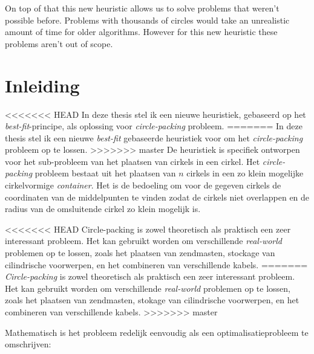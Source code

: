 \documentclass[12pt,a4paper,oneside]{book}
\begin{document}
On top of that this new heuristic allows us to solve problems that weren't possible before.
Problems with thousands of circles would take an unrealistic amount of time for older algorithms.
However for this new heuristic these problems aren't out of scope.

\newpage

\tableofcontents
\listoffigures
{}
\listoftables
{}

\newpage

\setcounter{page}{0}

\chapter{Inleiding}

<<<<<<< HEAD
In deze thesis stel ik een nieuwe heuristiek, gebaseerd op het \textit{best-fit}-principe, als oplossing voor \textit{circle-packing} probleem.
=======
In deze thesis stel ik een nieuwe \textit{best-fit} gebaseerde heuristiek voor om het \textit{circle-packing} probleem op te lossen.
>>>>>>> master
De heuristiek is specifiek ontworpen voor het sub-probleem van het plaatsen van cirkels in een cirkel.
Het \textit{circle-packing} probleem bestaat uit het plaatsen van $n$ cirkels in een zo klein mogelijke cirkelvormige \textit{container}.
Het is de bedoeling om voor de gegeven cirkels de coordinaten van de middelpunten te vinden zodat de cirkels niet overlappen en de radius van de omsluitende cirkel zo klein mogelijk is.

<<<<<<< HEAD
Circle-packing is zowel theoretisch als praktisch een zeer interessant probleem.
Het kan gebruikt worden om verschillende \textit{real-world} problemen op te lossen, zoals het plaatsen van zendmasten, stockage van cilindrische voorwerpen, en het combineren van verschillende kabels. 
=======
\textit{Circle-packing} is zowel theoretisch als praktisch een zeer interessant probleem.
Het kan gebruikt worden om verschillende \textit{real-world} problemen op te lossen, zoals het plaatsen van zendmasten, stokage van cilindrische voorwerpen, en het combineren van verschillende kabels. 
>>>>>>> master

Mathematisch is het probleem redelijk eenvoudig als een optimalisatieprobleem te omschrijven:
\end{document}
